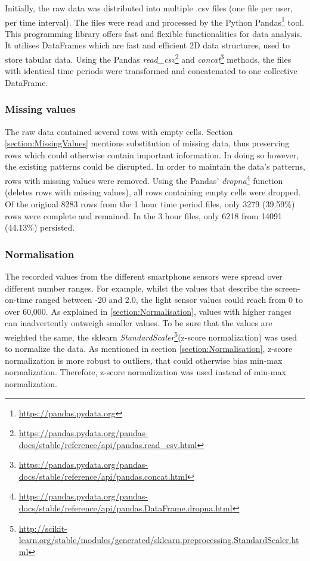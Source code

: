 Initially, the raw data was distributed into multiple .csv files (one file per user, per time interval). The files were read and processed by the Python Pandas\footnote{\url{https://pandas.pydata.org}} tool. This programming library offers fast and flexible functionalities for data analysis. It utilises DataFrames which are fast and efficient 2D data structures, used to store tabular data. Using the Pandas \textit{read\_csv}\footnote{\url{https://pandas.pydata.org/pandas-docs/stable/reference/api/pandas.read_csv.html}} and \textit{concat}\footnote{\url{https://pandas.pydata.org/pandas-docs/stable/reference/api/pandas.concat.html}} methods, the files with identical time periods were transformed and concatenated to one collective DataFrame. 


\subsubsection{Missing values}
The raw data contained several rows with empty cells. Section \ref{section:MissingValues} mentions substitution of missing data, thus preserving rows which could otherwise contain important information. In doing so however, the existing patterns could be disrupted. In order to maintain the data's patterns, rows with missing values were removed. Using the Pandas' \textit{dropna}\footnote{\url{https://pandas.pydata.org/pandas-docs/stable/reference/api/pandas.DataFrame.dropna.html}} function (deletes rows with missing values), all rows containing empty cells were dropped. Of the original 8283 rows from the 1 hour time period files, only 3279 (39.59\%) rows were complete and remained. In the 3 hour files, only 6218 from 14091 (44.13\%) persisted.

\subsubsection{Normalisation}
The recorded values from the different smartphone sensors were spread over different number ranges. For example, whilst the values that describe the screen-on-time ranged between -20 and 2.0, the light sensor values could reach from 0 to over 60,000. As explained in \ref{section:Normalisation}, values with higher ranges can inadvertently outweigh smaller values. To be sure that the values are weighted the same, the sklearn \textit{StandardScaler}\footnote{\url{http://scikit-learn.org/stable/modules/generated/sklearn.preprocessing.StandardScaler.html}}(z-score normalization) was used to normalize the data. As mentioned in section \ref{section:Normalisation}, z-score normalization is more robust to outliers, that could otherwise bias min-max normalization. Therefore, z-score normalization was used instead of min-max normalization.


